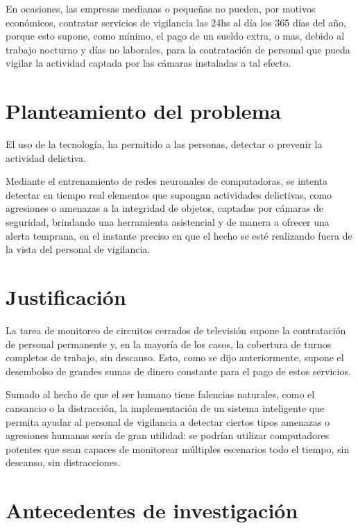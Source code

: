 \documentclass[a4paper,12pt,oneside,spanish]{book}
\begin{document}
En ocasiones, las empresas medianas o pequeñas no pueden, por motivos económicos, contratar servicios de vigilancia las 24hs al día los 365 días del año, porque esto supone, como mínimo, el pago de un sueldo extra, o mas, debido al trabajo nocturno y días no laborales, para la contratación de personal que pueda vigilar la actividad captada por las cámaras instaladas a tal efecto.\par

\section{Planteamiento del problema}
El uso de la tecnología, ha permitido a las personas, detectar o prevenir la actividad delictiva.\par

Mediante el entrenamiento de redes neuronales de computadoras, se intenta detectar en tiempo real elementos que supongan actividades delictivas, como agresiones o amenazas a la integridad de objetos, captadas por cámaras de seguridad, brindando una herramienta asistencial y de manera a ofrecer una alerta temprana, en el instante preciso en que el hecho se esté realizando fuera de la vista del personal de vigilancia.\par

\section{Justificación}
La tarea de monitoreo de circuitos cerrados de televisión supone la contratación de personal permanente y, en la mayoría de los casos, la cobertura de  turnos completos de trabajo, sin descanso. Esto, como se dijo anteriormente, supone el desembolso de grandes sumas de dinero constante para el pago de estos servicios.\par

Sumado al hecho de que el ser humano tiene falencias naturales, como el cansancio o la distracción, la implementación de un sistema inteligente que permita ayudar al personal de vigilancia a detectar ciertos tipos amenazas o agresiones humanas sería de gran utilidad: se podrían utilizar computadores potentes que sean capaces de monitorear  múltiples escenarios todo el tiempo, sin descanso, sin distracciones.\par 


\newpage
\section{Antecedentes de investigación}
\end{document}
